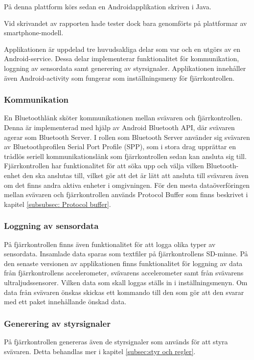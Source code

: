  På denna plattform körs sedan
en Androidapplikation skriven i Java.

 Vid skrivandet av rapporten hade tester dock bara
genomförts på plattformar av smartphone-modell.

Applikationen är uppdelad tre huvudsakliga delar som var och en utgörs av en Android-service. Dessa delar implementerar funktionalitet för kommunikation, loggning av sensordata samt generering av styrsignaler. Applikationen innehåller även Android-activity som fungerar som inställningsmeny för fjärrkontrollen.

\subsubsection{Kommunikation}
En Bluetoothlänk sköter kommunikationen mellan svävaren och fjärrkontrollen.
Denna är implementerad med hjälp av Android Bluetooth API, där svävaren agerar
som Bluetooth Server. I rollen som Bluetooth Server använder sig svävaren av
Bluetoothprofilen Serial Port Profile (SPP), som i stora drag upprättar en
trådlös seriell kommunikationslänk som fjärrkontrollen sedan kan ansluta sig
till.
Fjärrkontrollen har funktionalitet för att söka upp och välja vilken
Bluetooth-enhet den ska anslutas till, vilket gör att det är lätt att ansluta
till svävaren även om det finns andra aktiva enheter i omgivningen.
För den mesta dataöverföringen mellan svävaren och fjärrkontrollen används
Protocol Buffer som finns beskrivet i kapitel \ref{subsubsec: Protocol buffer}.

\subsubsection{Loggning av sensordata}
På fjärrkontrollen finns även funktionalitet för att logga olika typer av sensordata. Insamlade data sparas som textfiler på fjärrkontrollens SD-minne. 
På den senaste versionen av applikationen finns funktionalitet för loggning av data från fjärrkontrollens accelerometer, svävarens accelerometer samt från svävarens ultraljudssensorer. Vilken data som skall loggas ställs in i inställningsmenyn. Om data från svävaren önskas skickas ett kommando till den som gör att den svarar med ett paket innehållande önskad data. 

\subsubsection{Generering av styrsignaler}
På fjärrkontrollen genereras även de styrsignaler som används för att styra
svävaren. Detta behandlas mer i kapitel \ref{subsec:styr och regler}.

